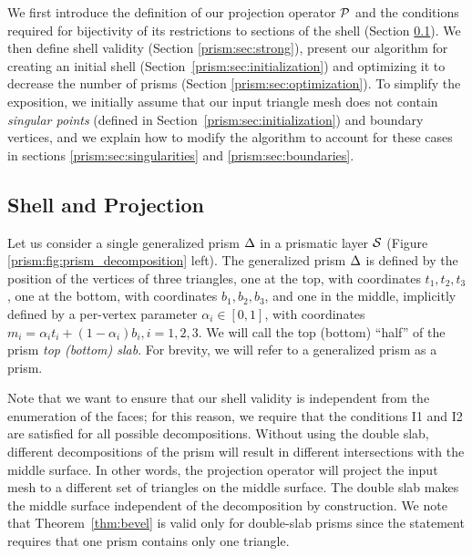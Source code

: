 We first introduce the definition of our projection operator $\P$ and the conditions required for bijectivity of its restrictions to sections of the shell (Section \ref{prism:sec:projection}). We then define shell validity (Section \ref{prism:sec:strong}), present our algorithm for creating an initial shell (Section\ \ref{prism:sec:initialization}) and optimizing it to decrease the number of prisms (Section \ref{prism:sec:optimization}).
To simplify the exposition,
we initially assume that our input triangle mesh does not contain \emph{singular points} (defined in Section~\ref{prism:sec:initialization}) and boundary vertices, and we explain how to modify the algorithm to account for these cases in sections \ref{prism:sec:singularities} and \ref{prism:sec:boundaries}.

\subsection{Shell and Projection}
\label{prism:sec:projection}

Let us consider a single generalized prism $\Prism$ in a prismatic layer $\S$ (Figure \ref{prism:fig:prism_decomposition} left). The generalized prism $\Prism$ is defined by the position of the vertices of three triangles, one at the top, with coordinates $t_1,t_2,t_3$, one at the bottom, with coordinates $b_1,b_2,b_3$, and one in the middle, implicitly defined by a per-vertex parameter $\alpha_i \in [0, 1]$, with coordinates $m_i = \alpha_i t_i + (1-\alpha_i) b_i, i=1,2,3$. We will call the top (bottom) ``half'' of the prism \emph{top (bottom) slab}. For brevity, we will refer to a generalized prism as a prism.

Note that we want to ensure that our shell validity is independent from the enumeration of the faces; for this reason, we require that the conditions I1 and I2 are satisfied for all possible decompositions. Without using the double slab, different decompositions of the prism will result in  different intersections with the middle surface. In other words, the projection operator will project the input mesh to a different set of triangles on the middle surface. 
The double slab makes the middle surface independent of the decomposition by construction. 
We note that Theorem~\ref{thm:bevel} is valid only for double-slab prisms since the statement requires that one prism contains only one triangle.



